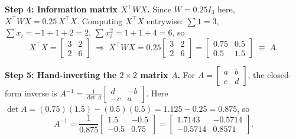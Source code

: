 \documentclass[a4paper,11pt]{article}
\begin{document}
\textbf{Step 4: Information matrix $X^\top W X$.} Since $W=0.25 I_3$ here, $X^\top W X = 0.25\,X^\top X$. Computing $X^\top X$ entrywise: $\sum 1 = 3$, $\sum x_i = -1+1+2=2$, $\sum x_i^2 = 1+1+4=6$, so
\begin{equation}
X^\top X = \begin{bmatrix} 3 & 2\\ 2 & 6\end{bmatrix}
\;\Longrightarrow\;
X^\top W X = 0.25\begin{bmatrix} 3 & 2\\ 2 & 6\end{bmatrix} = \begin{bmatrix} 0.75 & 0.5\\ 0.5 & 1.5\end{bmatrix} \;\equiv\; A.
\end{equation}

\textbf{Step 5: Hand-inverting the $2\times 2$ matrix $A$.} For $A=\begin{bmatrix}a&b\\c&d\end{bmatrix}$, the closed-form inverse is $A^{-1}=\frac{1}{\det A}\begin{bmatrix}d&-b\\-c&a\end{bmatrix}$. Here $\det A = (0.75)(1.5)-(0.5)(0.5)=1.125-0.25=0.875$, so
\begin{equation}
A^{-1} = \frac{1}{0.875}\begin{bmatrix} 1.5 & -0.5 \\ -0.5 & 0.75 \end{bmatrix}
= \begin{bmatrix} 1.7143 & -0.5714 \\ -0.5714 & 0.8571 \end{bmatrix}.
\end{equation}
\end{document}

